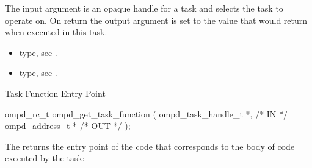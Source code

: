 \argdesc
The input argument  is an opaque handle for a task and selects the task to operate on.
On return the output argument  is set to the value that  would return when
executed in this task.

\crossreferences
\begin{itemize}
	\item {} type, see .
	\item {} type, see .
\end{itemize}

%
%
%


\summary
Task Function Entry Point
\format
\cspecificstart
\begin{boxedcode}
ompd\_rc\_t ompd\_get\_task\_function (
  ompd\_task\_handle\_t *,                                 /* IN */
  ompd\_address\_t *                                 /* OUT */
);
\end{boxedcode}
\cspecificend

\descr
The  returns the entry point of the code
that corresponds to the body of code executed by the task:


